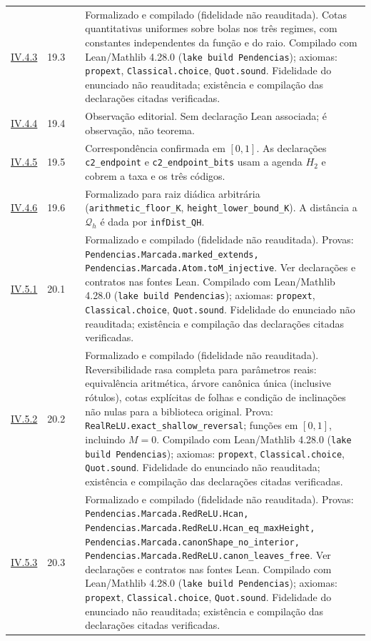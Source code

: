 \documentclass[12pt,a4paper]{article}
\theoremstyle{preciso}
\theoremstyle{definition}
\newcommand{\code}[1]{\nolinkurl{#1}}
\theoremstyle{preciso}
\theoremstyle{preciso}
\theoremstyle{preciso}
\theoremstyle{preciso}
\theoremstyle{definition}
\theoremstyle{preciso}
\theoremstyle{definition}
\theoremstyle{preciso}
\theoremstyle{preciso}
\theoremstyle{definition}
\begin{document}
\begin{singlespace}
\begin{longtable}{@{}p{.11\linewidth}p{.09\linewidth}p{.09\linewidth}p{.59\linewidth}@{}}
\hyperref[map:artigo_3:4.3]{IV.4.3} & 19.3 & \pageref{map:artigo_3:4.3} & Formalizado e compilado (fidelidade não reauditada). Cotas quantitativas uniformes sobre bolas nos três regimes, com constantes independentes da função e do raio. Compilado com Lean/Mathlib 4.28.0 (\texttt{lake build Pendencias}); axiomas: \texttt{propext}, \texttt{Classical.choice}, \texttt{Quot.sound}. Fidelidade do enunciado não reauditada; existência e compilação das declarações citadas verificadas.\\[4pt]
\hyperref[map:artigo_3:4.4]{IV.4.4} & 19.4 & \pageref{map:artigo_3:4.4} & Observação editorial. Sem declaração Lean associada; é observação, não teorema.\\[4pt]
\hyperref[map:artigo_3:4.5]{IV.4.5} & 19.5 & \pageref{map:artigo_3:4.5} & Correspondência confirmada em $[0,1]$. As declarações \code{c2_endpoint} e \code{c2_endpoint_bits} usam a agenda $H_2$ e cobrem a taxa e os três códigos.\\[4pt]
\hyperref[map:artigo_3:4.6]{IV.4.6} & 19.6 & \pageref{map:artigo_3:4.6} & Formalizado para raiz diádica arbitrária (\code{arithmetic_floor_K}, \code{height_lower_bound_K}). A distância a $\mathcal Q_h$ é dada por \code{infDist_QH}.\\[4pt]
\hyperref[map:artigo_3:5.1]{IV.5.1} & 20.1 & \pageref{map:artigo_3:5.1} & Formalizado e compilado (fidelidade não reauditada). Provas: \code{Pendencias.Marcada.marked_extends, Pendencias.Marcada.Atom.toM_injective}. Ver declarações e contratos nas fontes Lean. Compilado com Lean/Mathlib 4.28.0 (\texttt{lake build Pendencias}); axiomas: \texttt{propext}, \texttt{Classical.choice}, \texttt{Quot.sound}. Fidelidade do enunciado não reauditada; existência e compilação das declarações citadas verificadas.\\[4pt]
\hyperref[map:artigo_3:5.2]{IV.5.2} & 20.2 & \pageref{map:artigo_3:5.2} & Formalizado e compilado (fidelidade não reauditada). Reversibilidade rasa completa para parâmetros reais: equivalência aritmética, árvore canônica única (inclusive rótulos), cotas explícitas de folhas e condição de inclinações não nulas para a biblioteca original. Prova: \code{RealReLU.exact_shallow_reversal}; funções em $[0,1]$, incluindo $M=0$. Compilado com Lean/Mathlib 4.28.0 (\texttt{lake build Pendencias}); axiomas: \texttt{propext}, \texttt{Classical.choice}, \texttt{Quot.sound}. Fidelidade do enunciado não reauditada; existência e compilação das declarações citadas verificadas.\\[4pt]
\hyperref[map:artigo_3:5.3]{IV.5.3} & 20.3 & \pageref{map:artigo_3:5.3} & Formalizado e compilado (fidelidade não reauditada). Provas: \code{Pendencias.Marcada.RedReLU.Hcan, Pendencias.Marcada.RedReLU.Hcan_eq_maxHeight, Pendencias.Marcada.canonShape_no_interior, Pendencias.Marcada.RedReLU.canon_leaves_free}. Ver declarações e contratos nas fontes Lean. Compilado com Lean/Mathlib 4.28.0 (\texttt{lake build Pendencias}); axiomas: \texttt{propext}, \texttt{Classical.choice}, \texttt{Quot.sound}. Fidelidade do enunciado não reauditada; existência e compilação das declarações citadas verificadas.\\[4pt]

\end{longtable}
\end{singlespace}
\end{document}
